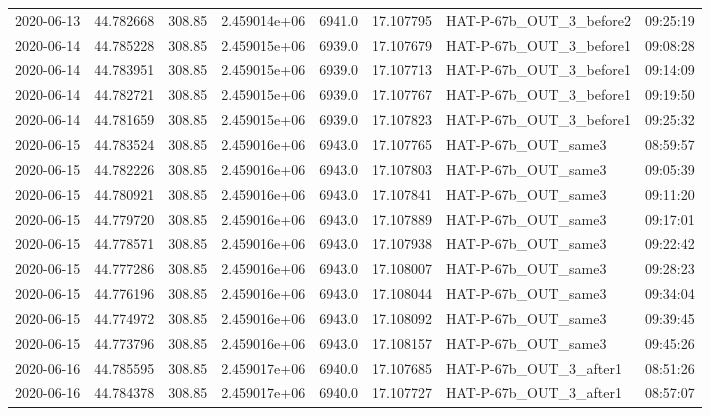 \documentclass{aastex631}
\begin{document}
\begin{tabular}{lrrrlrll}
    2020-06-13 & 44.782668   & 308.85        & 2.459014e+06 & 6941.0 & 17.107795 & HAT-P-67b\_OUT\_3\_before2 & 09:25:19 \\
    2020-06-14 & 44.785228   & 308.85        & 2.459015e+06 & 6939.0 & 17.107679 & HAT-P-67b\_OUT\_3\_before1 & 09:08:28 \\
    2020-06-14 & 44.783951   & 308.85        & 2.459015e+06 & 6939.0 & 17.107713 & HAT-P-67b\_OUT\_3\_before1 & 09:14:09 \\
    2020-06-14 & 44.782721   & 308.85        & 2.459015e+06 & 6939.0 & 17.107767 & HAT-P-67b\_OUT\_3\_before1 & 09:19:50 \\
    2020-06-14 & 44.781659   & 308.85        & 2.459015e+06 & 6939.0 & 17.107823 & HAT-P-67b\_OUT\_3\_before1 & 09:25:32 \\
    2020-06-15 & 44.783524   & 308.85        & 2.459016e+06 & 6943.0 & 17.107765 & HAT-P-67b\_OUT\_same3      & 08:59:57 \\
    2020-06-15 & 44.782226   & 308.85        & 2.459016e+06 & 6943.0 & 17.107803 & HAT-P-67b\_OUT\_same3      & 09:05:39 \\
    2020-06-15 & 44.780921   & 308.85        & 2.459016e+06 & 6943.0 & 17.107841 & HAT-P-67b\_OUT\_same3      & 09:11:20 \\
    2020-06-15 & 44.779720   & 308.85        & 2.459016e+06 & 6943.0 & 17.107889 & HAT-P-67b\_OUT\_same3      & 09:17:01 \\
    2020-06-15 & 44.778571   & 308.85        & 2.459016e+06 & 6943.0 & 17.107938 & HAT-P-67b\_OUT\_same3      & 09:22:42 \\
    2020-06-15 & 44.777286   & 308.85        & 2.459016e+06 & 6943.0 & 17.108007 & HAT-P-67b\_OUT\_same3      & 09:28:23 \\
    2020-06-15 & 44.776196   & 308.85        & 2.459016e+06 & 6943.0 & 17.108044 & HAT-P-67b\_OUT\_same3      & 09:34:04 \\
    2020-06-15 & 44.774972   & 308.85        & 2.459016e+06 & 6943.0 & 17.108092 & HAT-P-67b\_OUT\_same3      & 09:39:45 \\
    2020-06-15 & 44.773796   & 308.85        & 2.459016e+06 & 6943.0 & 17.108157 & HAT-P-67b\_OUT\_same3      & 09:45:26 \\
    2020-06-16 & 44.785595   & 308.85        & 2.459017e+06 & 6940.0 & 17.107685 & HAT-P-67b\_OUT\_3\_after1  & 08:51:26 \\
    2020-06-16 & 44.784378   & 308.85        & 2.459017e+06 & 6940.0 & 17.107727 & HAT-P-67b\_OUT\_3\_after1  & 08:57:07 \\

\end{tabular}
\end{document}
